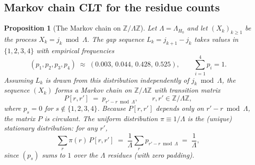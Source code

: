 \documentclass[
]{article}
\newtheorem{proposition}[theorem]{Proposition}
\begin{document}
\subsection{Markov chain CLT for the residue counts}
\label{sec:markov-clt}

\begin{proposition}[The Markov chain on $\mathbb{Z}/\Lambda\mathbb{Z}$]
\label{prop:markov-chain-setup}
Let $\Lambda = \Lambda_{H_0}$ and let $(X_k)_{k\geq 1}$ be the process
$X_k = j_k \bmod \Lambda$.  The gap sequence $L_k = j_{k+1} - j_k$
takes values in $\{1,2,3,4\}$ with empirical frequencies
\[
  (p_1,p_2,p_3,p_4) \;\approx\; (0.003,\,0.044,\,0.428,\,0.525),
  \qquad \sum_{i=1}^4 p_i = 1.
\]
Assuming $L_k$ is drawn from this distribution independently of
$j_k \bmod \Lambda$, the sequence $(X_k)$ forms a Markov chain on
$\mathbb{Z}/\Lambda\mathbb{Z}$ with transition matrix
\[
  P[r,r'] \;=\; p_{r'-r \bmod \Lambda}, \qquad r,r'\in\mathbb{Z}/\Lambda\mathbb{Z},
\]
where $p_s = 0$ for $s \notin \{1,2,3,4\}$.  Because $P[r,r']$ depends
only on $r'-r \bmod \Lambda$, the matrix $P$ is \emph{circulant}.
The uniform distribution $\pi \equiv 1/\Lambda$ is the (unique) stationary
distribution: for any $r'$,
\[
  \sum_{r} \pi(r)\,P[r,r'] \;=\; \frac{1}{\Lambda}\sum_{r} p_{r'-r\bmod\Lambda}
  \;=\; \frac{1}{\Lambda},
\]
since $(p_s)$ sums to $1$ over the $\Lambda$ residues (with zero padding).
\end{proposition}
\end{document}

